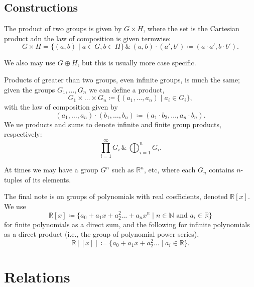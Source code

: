 \documentclass[12pt,oneside]{report}
\begin{document}
\subsection{Constructions}

\begin{definition}
  The product of two groups is given by \( G\times H \), where the set is the Cartesian product adn the law of composition is given termwise:
  \begin{displaymath}
    G\times H = \{(a,b)\mid a \in G,b\in H\} \, \& \, (a,b)\cdot (a',b')\coloneqq (a\cdot a',b\cdot b').
  \end{displaymath}
  
\end{definition}
We also may use \( G\oplus H \), but this is usually more case specific. 

Products of greater than two groups, even infinite groups, is much the same; given the groups \(G_{1},\ldots ,G_n\) we can define a product, \[ G_{1}\times \ldots \times G_n \coloneqq  \{ (a_{1},\ldots ,a_n) \mid  a_i \in  G_i \},\] with the law of composition given by \[ (a_{1},\ldots ,a_n)\cdot (b_{1},\ldots ,b_n)\coloneqq (a_{1}\cdot b_{2},\ldots ,a_n \cdot b_n).\] 
We ue products and sums to denote infinite and finite group products, respectively:\[
  \prod^{\infty}_{i=1} G_i \, \& \, \bigoplus_{i=1}^n G_i
.\] 

At times we may have a group \( G^n \) such as \( \mathbb{R}^n \), etc, where each \( G_n \) contains \( n \)-tuples of its elements. 

The final note is on groups of polynomials with real coefficients, denoted \( \mathbb{R}[x] \). We use \[
  \mathbb{R}[x] \coloneqq \{ a_{0}+a_{1}x+a_{2}^2\ldots +a_nx^n \mid  n \in  \mathbb{N} \text{ and } a_i \in  \mathbb{R} \}\]  for finite polynomials as a direct sum, and the following for infinite polynomials as a direct product (i.e., the group of polynomial power series), \[
  \mathbb{R}[[x]] \coloneqq \{ a_{0}+a_{1}x+a_{2}^2\ldots \mid a_i \in  \mathbb{R} \}
  .\]



\section{Relations}
\end{document}
